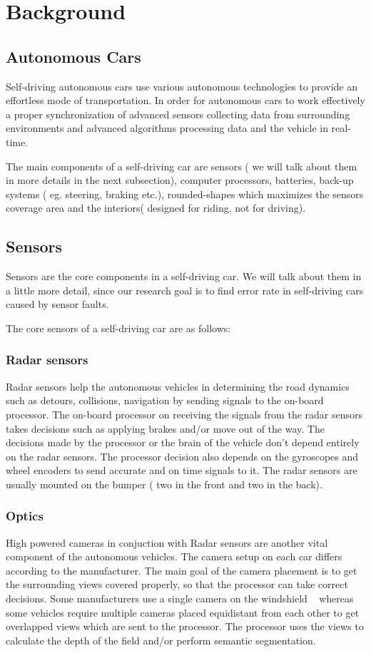\section{Background}
\subsection{ Autonomous Cars}
Self-driving autonomous cars use various autonomous technologies to provide an effortless mode of transportation. In order for autonomous cars to work effectively a proper synchronization of advanced sensors collecting data from surrounding environments and advanced algorithms processing data and the vehicle in real-time.

The main components of a self-driving car are sensors ( we will talk about them in more details in the next subsection), computer processors, batteries, back-up systems ( eg. steering, braking etc.), rounded-shapes which maximizes the sensors coverage area and the interiors( designed for riding, not for driving). 

\subsection{Sensors}
Sensors are the core components in a self-driving car. We will talk about them in a little more detail, since our research goal is to find error rate in self-driving cars caused by sensor faults.

The core sensors of a self-driving car are as follows:
\subsubsection{Radar sensors}
Radar sensors help the autonomous vehicles in determining the road dynamics such as detours, collisions, navigation by sending signals to the on-board processor. The on-board processor on receiving the signals from the radar sensors takes decisions such as applying brakes and/or move out of the way. The decisions made by the processor or the brain of the vehicle don't depend entirely on the radar sensors. The processor decision also depends on the gyroscopes and  wheel encoders to send accurate and on time signals to it. The radar sensors are usually mounted on the bumper ( two in the front and two in the back).

\subsubsection{Optics}
High powered cameras in conjuction with Radar sensors are another vital component of the autonomous vehicles. The camera setup on each car differs according to the manufacturer. The main goal of the camera placement is to get the surrounding views covered properly, so that the processor can take correct decisions. Some manufacturers use a single camera on the windshield ~\cite{singlecamera} whereas some vehicles require multiple cameras placed equidistant from each other to get overlapped views which are sent to the processor. The processor uses the views to calculate the depth of the field and/or perform semantic segmentation.


